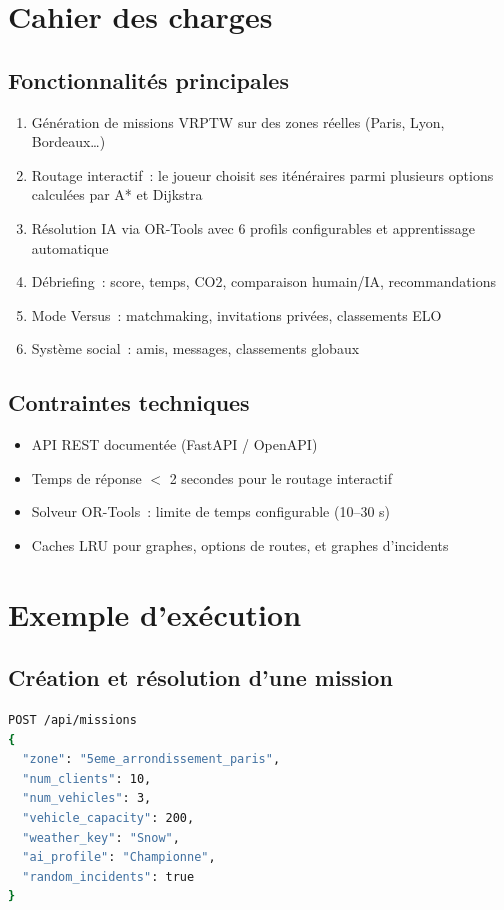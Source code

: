 \documentclass[a4paper, 12pt, twoside]{article}
\begin{document}
\section{Cahier des charges}

\subsection*{Fonctionnalit\'{e}s principales}
\begin{enumerate}
  \item G\'{e}n\'{e}ration de missions VRPTW sur des zones r\'{e}elles (Paris, Lyon, Bordeaux\ldots)
  \item Routage interactif~: le joueur choisit ses it\'{e}n\'{e}raires parmi plusieurs options calcul\'{e}es par A* et Dijkstra
  \item R\'{e}solution IA via OR-Tools avec 6 profils configurables et apprentissage automatique
  \item D\'{e}briefing~: score, temps, CO2, comparaison humain/IA, recommandations
  \item Mode Versus~: matchmaking, invitations priv\'{e}es, classements ELO
  \item Syst\`{e}me social~: amis, messages, classements globaux
\end{enumerate}

\subsection*{Contraintes techniques}
\begin{itemize}
  \item API REST document\'{e}e (FastAPI / OpenAPI)
  \item Temps de r\'{e}ponse $<$ 2 secondes pour le routage interactif
  \item Solveur OR-Tools~: limite de temps configurable (10--30 s)
  \item Caches LRU pour graphes, options de routes, et graphes d'incidents
\end{itemize}

\section{Exemple d'ex\'{e}cution}

\subsection*{Cr\'{e}ation et r\'{e}solution d'une mission}
\begin{lstlisting}[language=bash, caption={Cr\'{e}ation d'une mission via l'API REST}]
POST /api/missions
{
  "zone": "5eme_arrondissement_paris",
  "num_clients": 10,
  "num_vehicles": 3,
  "vehicle_capacity": 200,
  "weather_key": "Snow",
  "ai_profile": "Championne",
  "random_incidents": true
}
\end{lstlisting}
\end{document}
